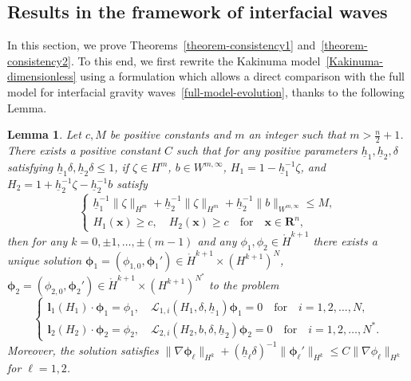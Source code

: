 \documentclass[11pt,leqno]{article}
\newtheorem{lemma}[theorem]{\bf Lemma}
\numberwithin{equation}{section}
\numberwithin{figure}{section}
\begin{document}
\subsection{Results in the framework of interfacial waves}\label{S.cons:two-layers}
%
In this section, we prove Theorems~\ref{theorem-consistency1} and~\ref{theorem-consistency2}. 
To this end, we first rewrite the Kakinuma model~\eqref{Kakinuma-dimensionless} using a formulation 
which allows a direct comparison with the full model for interfacial gravity waves~\eqref{full-model-evolution}, 
thanks to the following Lemma. 


\begin{lemma}\label{L.Lambda}
Let $c, M$ be positive constants and $m$ an integer such that $m>\frac{n}{2}+1$. 
There exists a positive constant $C$ such that for any positive parameters 
$\underline{h}_1, \underline{h}_2, \delta$ satisfying $\underline{h}_1\delta, \underline{h}_2\delta \leq 1$, 
if $\zeta\in H^m$, $b\in W^{m,\infty}$, $H_1 = 1 - \underline{h}_1^{-1}\zeta$, and 
$H_2 = 1 + \underline{h}_2^{-1}\zeta - \underline{h}_2^{-1}b$ satisfy 
%
\begin{equation}\label{eq-Hyp20}
\begin{cases}
 \underline{h}_1^{-1}\|\zeta\|_{H^m} + \underline{h}_2^{-1}\|\zeta\|_{H^m}
  + \underline{h}_2^{-1}\|b\|_{W^{m,\infty}} \leq M, \\
 H_1(\bm{x})\geq c, \quad H_2(\bm{x})\geq c \quad\mbox{for}\quad \bm{x}\in\mathbf{R}^n,
\end{cases}
\end{equation}
%
then for any $k=0,\pm1,\ldots,\pm(m-1)$ and any $\phi_1,\phi_2 \in \mathring{H}^{k+1}$ there exists a 
unique solution $\bm{\phi}_1=(\phi_{1,0},\bm{\phi}_1')\in \mathring{H}^{k+1}\times(H^{k+1})^N$, 
$\bm{\phi}_2=(\phi_{2,0},\bm{\phi}_2')\in \mathring{H}^{k+1}\times(H^{k+1})^{N^*}$ to the problem 
%
\begin{equation}\label{Conditions2}
\begin{cases}
 \bm{l}_1(H_1)\cdot\bm{\phi}_1=\phi_1, \quad \mathcal{L}_{1,i}(H_1,\delta,\underline{h}_1)\bm{\phi}_1=0
  \quad\mbox{for}\quad i=1,2,\ldots,N, \\
 \bm{l}_2(H_2)\cdot\bm{\phi}_2=\phi_2, \quad \mathcal{L}_{2,i}(H_2,b,\delta,\underline{h}_2)\bm{\phi}_2=0
  \quad\mbox{for}\quad i=1,2,\ldots,N^*.
\end{cases}
\end{equation}
%
Moreover, the solution satisfies 
$\|\nabla\bm{\phi}_\ell\|_{H^k} + (\underline{h}_\ell\delta)^{-1}\|\bm{\phi}_\ell'\|_{H^k} \leq C\|\nabla\phi_\ell\|_{H^k}$ for $\ell=1,2$. 
\end{lemma}
\end{document}
